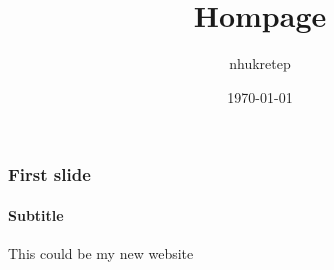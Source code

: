 \documentclass{beamer}
\begin{document}
\title{Hompage}   
\author{nhukretep} 
\date{\today}

\begin{frame}
\frametitle{First slide}
\framesubtitle{Subtitle}
This could be my new website
\end{frame}
\end{document}
